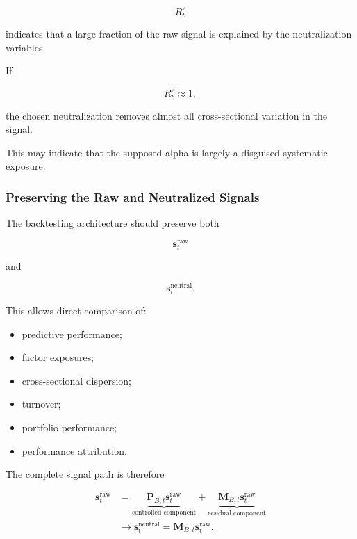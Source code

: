 \documentclass[11pt,a4paper]{article}
\begin{document}
\begin{equation}
R_t^2
\end{equation}

indicates that a large fraction of the raw signal is explained by the
neutralization variables.

If

\begin{equation}
R_t^2
\approx
1,
\end{equation}

the chosen neutralization removes almost all cross-sectional variation in the
signal.

This may indicate that the supposed alpha is largely a disguised systematic
exposure.


\subsubsection{Preserving the Raw and Neutralized Signals}

The backtesting architecture should preserve both

\begin{equation}
\mathbf{s}_t^{\mathrm{raw}}
\end{equation}

and

\begin{equation}
\mathbf{s}_t^{\mathrm{neutral}}.
\end{equation}

This allows direct comparison of:

\begin{itemize}
    \item predictive performance;
    \item factor exposures;
    \item cross-sectional dispersion;
    \item turnover;
    \item portfolio performance;
    \item performance attribution.
\end{itemize}

The complete signal path is therefore

\begin{equation}
\boxed{
\begin{aligned}
\mathbf{s}_t^{\mathrm{raw}}
&=
\underbrace{
\mathbf{P}_{B,t}
\mathbf{s}_t^{\mathrm{raw}}
}_{\text{controlled component}}
+
\underbrace{
\mathbf{M}_{B,t}
\mathbf{s}_t^{\mathrm{raw}}
}_{\text{residual component}}
\\[0.15cm]
&\rightarrow
\mathbf{s}_t^{\mathrm{neutral}}
=
\mathbf{M}_{B,t}
\mathbf{s}_t^{\mathrm{raw}}.
\end{aligned}
}
\end{equation}
\end{document}
